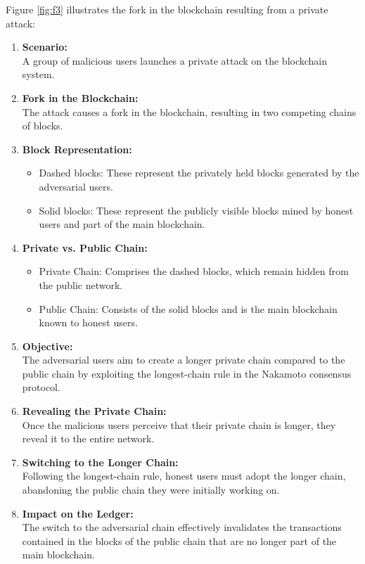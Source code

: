 \documentclass{report}
\begin{document}
Figure \ref{fig:f3} illustrates the fork in the blockchain resulting from a private attack:
\begin{enumerate}
	\item \textbf{Scenario:} \\A group of malicious users launches a private attack on the blockchain system.
	\item \textbf{Fork in the Blockchain:} \\The attack causes a fork in the blockchain, resulting in two competing chains of blocks.
	\item \textbf{Block Representation:} 
	\begin{itemize}
		\item Dashed blocks: These represent the privately held blocks generated by the adversarial users.
		\item Solid blocks: These represent the publicly visible blocks mined by honest users and part of the main blockchain.
	\end{itemize}
	\item \textbf{Private vs. Public Chain:}
	 \begin{itemize}
	 	\item Private Chain: Comprises the dashed blocks, which remain hidden from the public network.
	 	\item Public Chain: Consists of the solid blocks and is the main blockchain known to honest users.
	 \end{itemize}
 	\item \textbf{Objective:} \\The adversarial users aim to create a longer private chain compared to the public chain by exploiting the longest-chain rule in the Nakamoto consensus protocol.
 	\item \textbf{Revealing the Private Chain:}\\Once the malicious users perceive that their private chain is longer, they reveal it to the entire network.
 	\item \textbf{Switching to the Longer Chain:} \\Following the longest-chain rule, honest users must adopt the longer chain, abandoning the public chain they were initially working on.
 	\item \textbf{Impact on the Ledger:}\\The switch to the adversarial chain effectively invalidates the transactions contained in the blocks of the public chain that are no longer part of the main blockchain.
\end{enumerate}
\end{document}

